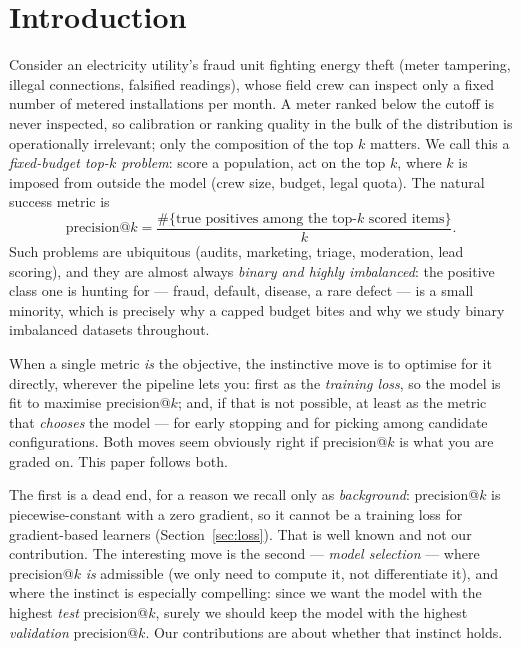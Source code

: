 \documentclass[11pt]{article}
\begin{document}
\section{Introduction}
Consider an electricity utility's fraud unit fighting energy theft (meter tampering, illegal
connections, falsified readings), whose field crew can inspect only a fixed number of metered
installations per month. A meter ranked below the cutoff is never inspected, so calibration or
ranking quality in the bulk of the distribution is operationally irrelevant; only the
composition of the top $k$ matters. We call this a \emph{fixed-budget top-$k$ problem}: score a
population, act on the top $k$, where $k$ is imposed from outside the model (crew size,
budget, legal quota). The natural success metric is
\begin{equation}
\text{precision@}k = \frac{\#\{\text{true positives among the top-}k\text{ scored items}\}}{k}.
\end{equation}
Such problems are ubiquitous (audits, marketing, triage, moderation, lead scoring), and they
are almost always \emph{binary and highly imbalanced}: the positive class one is hunting for
--- fraud, default, disease, a rare defect --- is a small minority, which is precisely why a
capped budget bites and why we study binary imbalanced datasets throughout.

When a single metric \emph{is} the objective, the instinctive move is to optimise for it
directly, wherever the pipeline lets you: first as the \emph{training loss}, so the model is
fit to maximise precision@$k$; and, if that is not possible, at least as the metric that
\emph{chooses} the model --- for early stopping and for picking among candidate
configurations. Both moves seem obviously right if precision@$k$ is what you are graded on.
This paper follows both.

The first is a dead end, for a reason we recall only as \emph{background}: precision@$k$ is
piecewise-constant with a zero gradient, so it cannot be a training loss for gradient-based
learners (Section~\ref{sec:loss}). That is well known and not our contribution. The interesting
move is the second --- \emph{model selection} --- where precision@$k$ \emph{is} admissible
(we only need to compute it, not differentiate it), and where the instinct is especially
compelling: since we want the model with the highest \emph{test} precision@$k$, surely we
should keep the model with the highest \emph{validation} precision@$k$. Our contributions are
about whether that instinct holds.
\end{document}
